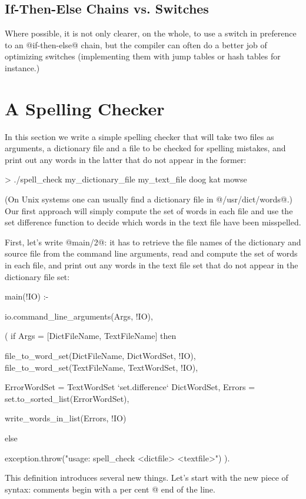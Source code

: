 \subsection{If-Then-Else Chains vs. Switches}

Where possible, it is not only clearer, on the whole, to use a switch in
preference to an @if-then-else@ chain, but the compiler can often do a
better job of optimizing switches (implementing them with jump tables or
hash
tables for instance.)



\section{A Spelling Checker}

In this section we write a simple spelling checker that will take two
files as arguments, a dictionary file and a file to be checked for spelling
mistakes, and print out any words in the latter that do not appear in the
former:
\begin{myverbatim}
> ./spell_check my_dictionary_file my_text_file
doog
kat
mowse
\end{myverbatim}
(On Unix systems one can usually find a dictionary file in
@/usr/dict/words@.)
Our first approach will simply compute the set of words in each file
and use the set difference function to decide which words in the text file
have been misspelled.

First, let's write @main/2@: it has to retrieve the file names of the
dictionary and source file from the command line arguments, read
and compute the set of words in each file, and print out any words in
the text file set that do not appear in the dictionary file set:
\begin{myverbatim}
main(!IO) :-

    io.command_line_arguments(Args, !IO),

    ( if Args = [DictFileName, TextFileName] then

        file_to_word_set(DictFileName, DictWordSet, !IO),
        file_to_word_set(TextFileName, TextWordSet, !IO),

        ErrorWordSet = TextWordSet `set.difference` DictWordSet,
        Errors       = set.to_sorted_list(ErrorWordSet),

        write_words_in_list(Errors, !IO)

      else

        exception.throw("usage: spell_check <dictfile> <textfile>")
    ).
\end{myverbatim}
This definition introduces several new things.  Let's start with the new
piece of syntax: comments begin with a per cent @%
end of the line.

